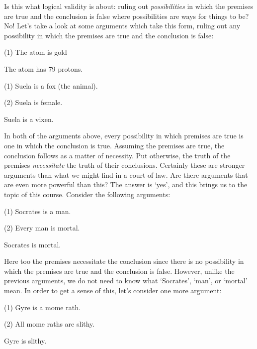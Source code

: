 Is this what logical validity is about: ruling out \textit{possibilities} in which the premises are true and the conclusion is false where possibilities are ways for things to be?
No!
Let's take a look at some arguments which take this form, ruling out any possibility in which the premises are true and the conclusion is false:

\begin{earg}
  \item[(1)] The atom is gold
  \item[\therefore] The atom has 79 protons.
\end{earg}


\begin{earg}
  \item[(1)] Suela is a fox (the animal).
  \item[(2)] Suela is female.
  \item[\therefore] Suela is a vixen.
\end{earg}

In both of the arguments above, every possibility in which premises are true is one in which the conclusion is true.
Assuming the premises are true, the conclusion follows as a matter of necessity.
Put otherwise, the truth of the premises \emph{necessitate} the truth of their conclusions.
Certainly these are stronger arguments than what we might find in a court of law.
Are there arguments that are even more powerful than this?
The answer is `yes', and this brings us to the topic of this course.
Consider the following arguments:

\begin{earg}
  \item[(1)] Socrates is a man.
  \item[(2)] Every man is mortal.
  \item[\therefore] Socrates is mortal.
\end{earg}

Here too the premises necessitate the conclusion since there is no possibility in which the premises are true and the conclusion is false.
However, unlike the previous arguments, we do not need to know what `Socrates', `man', or `mortal' mean.
In order to get a sense of this, let's consider one more argument:

\begin{earg}
  \item[(1)] Gyre is a mome rath.
  \item[(2)] All mome raths are slithy.
  \item[\therefore] Gyre is slithy.
\end{earg}

